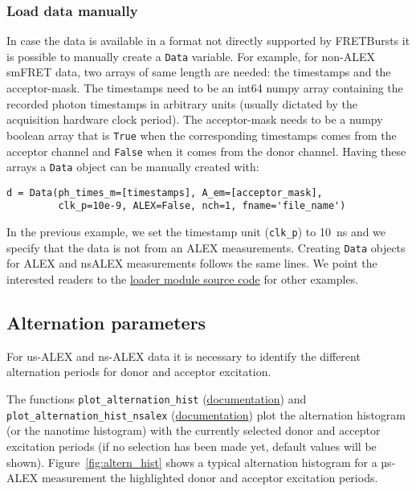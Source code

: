 \subsubsection{Load data manually}

In case the data is available in a format not directly supported by 
FRETBursts it is possible to manually create a \verb|Data| variable. 
For example, for non-ALEX smFRET data, two arrays of same length are 
needed: the timestamps and the acceptor-mask. The timestamps need to be 
an int64 numpy array containing the recorded photon timestamps in arbitrary 
units (usually dictated by the acquisition hardware clock period). 
The acceptor-mask needs to be a numpy boolean array that is \verb|True| 
when the corresponding timestamps comes from the acceptor channel and 
\verb|False| when it comes from the donor channel. Having these arrays a 
\verb|Data| object can be manually created with:

\begin{verbatim}
d = Data(ph_times_m=[timestamps], A_em=[acceptor_mask], 
         clk_p=10e-9, ALEX=False, nch=1, fname='file_name')
\end{verbatim}

In the previous example, we set the timestamp unit (\verb|clk_p|) to 10~ns 
and we specify that the data is not from an ALEX measurements. Creating 
\verb|Data| objects for ALEX and nsALEX measurements follows the same lines. 
We point the interested readers to the 
\href{https://github.com/tritemio/FRETBursts/blob/master/fretbursts/loader.py}{loader module source code} 
for other examples. 

\subsection{Alternation parameters}

For us-ALEX and ns-ALEX data it is necessary to identify the different 
alternation periods for donor and acceptor excitation.

The functions 
\verb|plot_alternation_hist| (\href{http://fretbursts.readthedocs.org/en/latest/plots.html#fretbursts.burst\_plot.plot\_alternation\_hist}{documentation})
and \verb|plot_alternation_hist_nsalex| (\href{http://fretbursts.readthedocs.org/en/latest/plots.html#fretbursts.burst\_plot.plot\_alternation\_hist\_nsalex}{documentation})
plot the alternation histogram (or the nanotime histogram)
with the currently selected donor and acceptor excitation periods
(if no selection has been made yet, default values will be shown).
Figure~\ref{fig:altern_hist} shows a typical alternation histogram for
a µs-ALEX measurement the highlighted donor and acceptor excitation periods.

